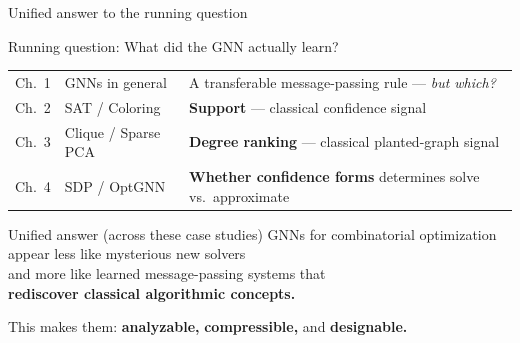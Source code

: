 \documentclass[aspectratio=169,10pt,dvipsnames]{beamer}
\begin{document}
\begin{frame}{Unified answer to the running question}

\begin{block}{Running question: What did the GNN actually learn?}
\small
\begin{tabular}{@{}llp{5.5cm}@{}}
Ch.\ 1 & GNNs in general & A transferable message-passing rule — \textit{but which?} \\
Ch.\ 2 & SAT / Coloring & \textbf{Support} — classical confidence signal \\
Ch.\ 3 & Clique / Sparse PCA & \textbf{Degree ranking} — classical planted-graph signal \\
Ch.\ 4 & SDP / OptGNN & \textbf{Whether confidence forms} determines solve vs.\ approximate \\
\end{tabular}
\end{block}

\medskip
\begin{alertblock}{Unified answer (across these case studies)}
\centering\large
GNNs for combinatorial optimization appear less like mysterious new solvers\\
and more like learned message-passing systems that\\
\textbf{rediscover classical algorithmic concepts.}
\end{alertblock}

\medskip\small\color{bgucolor}
\centering This makes them: \textbf{analyzable,} \textbf{compressible,} and \textbf{designable.}

\end{frame}
\end{document}
